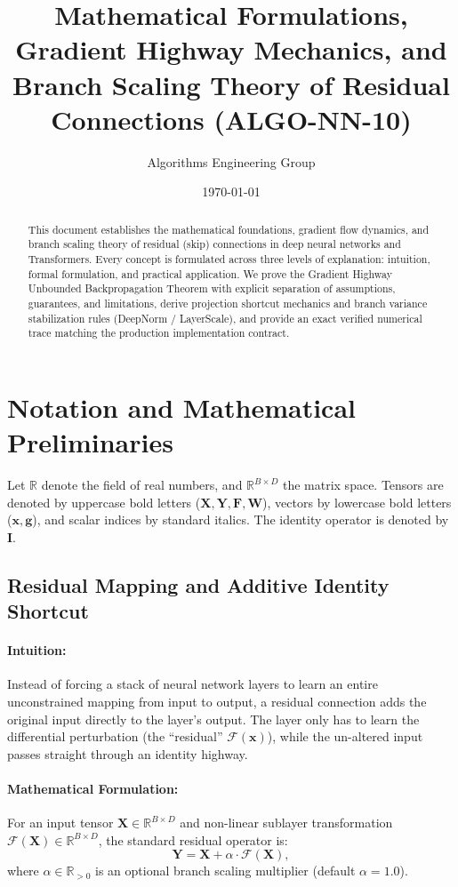 \documentclass[11pt]{article}
\title{Mathematical Formulations, Gradient Highway Mechanics, and Branch Scaling Theory of Residual Connections (ALGO-NN-10)}
\author{Algorithms Engineering Group}
\date{\today}
\begin{document}
\maketitle

\begin{abstract}
This document establishes the mathematical foundations, gradient flow dynamics, and branch scaling theory of residual (skip) connections in deep neural networks and Transformers. Every concept is formulated across three levels of explanation: intuition, formal formulation, and practical application. We prove the Gradient Highway Unbounded Backpropagation Theorem with explicit separation of assumptions, guarantees, and limitations, derive projection shortcut mechanics and branch variance stabilization rules (DeepNorm / LayerScale), and provide an exact verified numerical trace matching the production implementation contract.
\end{abstract}

\section{Notation and Mathematical Preliminaries}
\label{sec:notation}

Let $\mathbb{R}$ denote the field of real numbers, and $\mathbb{R}^{B \times D}$ the matrix space. Tensors are denoted by uppercase bold letters ($\mathbf{X}, \mathbf{Y}, \mathbf{F}, \mathbf{W}$), vectors by lowercase bold letters ($\mathbf{x}, \mathbf{g}$), and scalar indices by standard italics. The identity operator is denoted by $\mathbf{I}$.

\subsection{Residual Mapping and Additive Identity Shortcut}
\paragraph{Intuition:} Instead of forcing a stack of neural network layers to learn an entire unconstrained mapping from input to output, a residual connection adds the original input directly to the layer's output. The layer only has to learn the differential perturbation (the ``residual'' $\mathcal{F}(\mathbf{x})$), while the un-altered input passes straight through an identity highway.

\paragraph{Mathematical Formulation:}
For an input tensor $\mathbf{X} \in \mathbb{R}^{B \times D}$ and non-linear sublayer transformation $\mathcal{F}(\mathbf{X}) \in \mathbb{R}^{B \times D}$, the standard residual operator is:
\begin{equation}
\label{eq:res_def}
\mathbf{Y} = \mathbf{X} + \alpha \cdot \mathcal{F}(\mathbf{X}),
\end{equation}
where $\alpha \in \mathbb{R}_{>0}$ is an optional branch scaling multiplier (default $\alpha = 1.0$).
\end{document}
